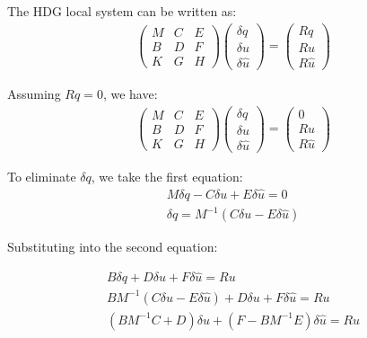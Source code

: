 \documentclass[11pt]{article}
\begin{document}
The HDG local system can be written as:
\begin{align} 
    \left( \begin{array}{ccc} M&C &E \\ B&D&F \\ K&G&H  \end{array} \right) 
    \left( \begin{array}{c} \delta q \\ \delta u \\ \delta \hat{u}  \end{array} \right) = 
    \left( \begin{array}{c} Rq \\ Ru  \\ R\hat{u}   \end{array} \right)
\end{align}

Assuming $Rq=0$, we have:
\begin{align} 
    \left( \begin{array}{ccc} M&C &E \\ B&D&F \\ K&G&H  \end{array} \right) 
    \left( \begin{array}{c} \delta q \\ \delta u \\ \delta \hat{u}  \end{array} \right) = 
    \left( \begin{array}{c} 0 \\ Ru  \\ R\hat{u}   \end{array} \right)
\end{align}

To eliminate $\delta q$, we take the first equation:
\begin{align}
    M \delta q - C \delta u  + E \delta\hat{u} = 0\\
    \delta q = M^{-1}(C \delta u  - E \delta\hat{u})
\end{align}

Substituting into the second equation:

\begin{align}
    B \delta q + D \delta u  + F \delta\hat{u} = Ru\\
    BM^{-1}(C \delta u  - E \delta\hat{u}) + D \delta u  + F \delta\hat{u} = Ru\\
    (BM^{-1}C +D)\delta u +(F-BM^{-1}E) \delta\hat{u} = Ru
\end{align}
\end{document}
